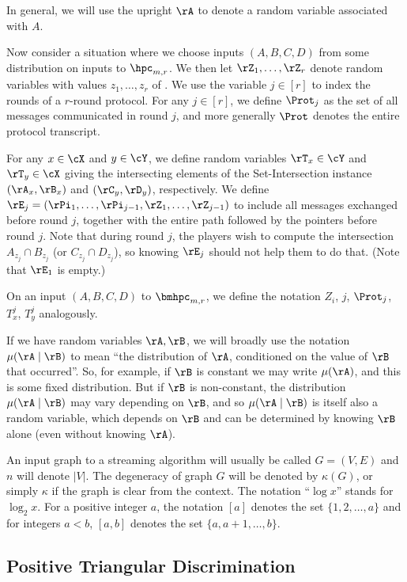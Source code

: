 In general, we will use the upright $\rA$ to denote a random variable
associated with $A$.

Now consider a situation where we choose inputs $(A, B, C, D)$ from some
distribution on inputs to $\hpc_{m,r}$.
We then let $\rZ_1, \ldots , \rZ_r$ denote random variables with values
$z_1, \ldots, z_r$ of .
We use the variable $j \in [r]$ to index the rounds of a
$r$-round protocol.
For any $j \in [r]$, we define $\Prot_j$ as the set of all messages
communicated in round $j$, and more generally $\Prot$ denotes the entire
protocol transcript. 

For any $x \in \cX$ and $y \in \cY$, we define random variables
$\rT_x \in \cY$ and $\rT_y \in \cX$ giving the intersecting elements of the
Set-Intersection instance $(\rA_x, \rB_x)$ and $(\rC_y, \rD_y)$, respectively.
We define $\rE_j = (\rPi_1, \ldots, \rPi_{j-1}, \rZ_1, \ldots, \rZ_{j-1})$ to
include all messages exchanged before round $j$, together with the entire path
followed by the pointers before round $j$.
Note that during round $j$, the players wish to compute the intersection
$A_{z_j} \cap B_{z_j}$ (or $C_{z_j} \cap D_{z_j}$), so knowing $\rE_j$ should
not help them to do that. (Note that $\rE_1$ is empty.)

On an input $(A, B, C, D)$ to $\bmhpc_{m,r}$, we define the notation
$Z_i$, $j$, $\Prot_j$, $T^j_x$, $T^j_y$ analogously.

If we have random variables $\rA, \rB$, we will broadly use the notation
$\mu(\rA \mid \rB)$ to mean ``the distribution of $\rA$, conditioned on the
value of $\rB$ that occurred''.
So, for example, if $\rB$ is constant we may write $\mu(\rA)$, and this
is some fixed distribution.
But if $\rB$ is non-constant, the distribution $\mu(\rA \mid \rB)$ may vary
depending on $\rB$, and so $\mu(\rA \mid \rB)$ is itself also a random
variable, which depends on $\rB$ and can be determined by knowing $\rB$ alone
(even without knowing $\rA$).

An input graph to a streaming algorithm will usually be called $G=(V,E)$ and $n$ will denote $|V|$. The degeneracy of graph $G$ will be denoted by $\kappa(G)$, or simply $\kappa$ if the graph is clear from the context. The notation ``$\log x$'' stands for $\log_2 x$. For a positive integer $a$, the notation $[a]$ denotes the set $\{1,2,\ldots,a\}$ and for integers $a<b$, $[a,b]$ denotes the set $\{a,a+1,\ldots,b\}$.
 


\subsection{Positive Triangular Discrimination} \label{sec:td}

